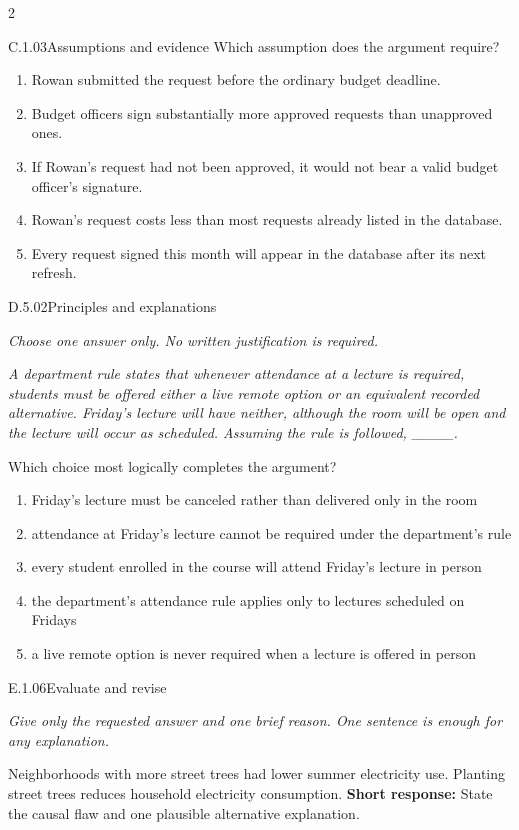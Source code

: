 \documentclass[9pt]{extarticle}
\newcommand{\choice}[1]{\item #1}
\begin{document}
\begin{multicols}{2}
\begin{DenseCoreProblem}{C.1.03}{Assumptions and evidence}
Which assumption does the argument require?
\begin{enumerate}[label=(\alph*)]
  \choice{Rowan submitted the request before the ordinary budget deadline.}
  \choice{Budget officers sign substantially more approved requests than unapproved ones.}
  \choice{If Rowan's request had not been approved, it would not bear a valid budget officer's signature.}
  \choice{Rowan's request costs less than most requests already listed in the database.}
  \choice{Every request signed this month will appear in the database after its next refresh.}
\end{enumerate}
\end{DenseCoreProblem}
\begin{DenseCoreProblem}{D.5.02}{Principles and explanations}
{\scriptsize\textit{Choose one answer only. No written justification is required.}\par}
\emph{A department rule states that whenever attendance at a lecture is required, students must be offered either a live remote option or an equivalent recorded alternative. Friday's lecture will have neither, although the room will be open and the lecture will occur as scheduled. Assuming the rule is followed, \_\_\_\_.}

Which choice most logically completes the argument?
\begin{enumerate}[label=(\alph*)]
  \choice{Friday's lecture must be canceled rather than delivered only in the room}
  \choice{attendance at Friday's lecture cannot be required under the department's rule}
  \choice{every student enrolled in the course will attend Friday's lecture in person}
  \choice{the department's attendance rule applies only to lectures scheduled on Fridays}
  \choice{a live remote option is never required when a lecture is offered in person}
\end{enumerate}
\end{DenseCoreProblem}
\begin{DenseCoreProblem}{E.1.06}{Evaluate and revise}
{\scriptsize\textit{Give only the requested answer and one brief reason. One sentence is enough for any explanation.}\par}
Neighborhoods with more street trees had lower summer electricity use. Planting street trees reduces household electricity consumption.
\textbf{Short response:} State the causal flaw and one plausible alternative explanation.
\end{DenseCoreProblem}
\end{multicols}
\CoreWorkArea
\FormBreak
{}
\end{document}
